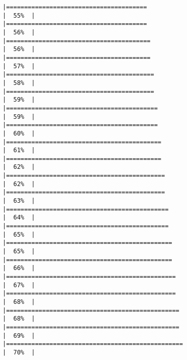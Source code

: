\documentclass[
]{article}
\begin{document}
\begin{verbatim}
|=======================================                               |  55%  |                                                                              |=======================================                               |  56%  |                                                                              |========================================                              |  56%  |                                                                              |========================================                              |  57%  |                                                                              |=========================================                             |  58%  |                                                                              |=========================================                             |  59%  |                                                                              |==========================================                            |  59%  |                                                                              |==========================================                            |  60%  |                                                                              |===========================================                           |  61%  |                                                                              |===========================================                           |  62%  |                                                                              |============================================                          |  62%  |                                                                              |============================================                          |  63%  |                                                                              |=============================================                         |  64%  |                                                                              |=============================================                         |  65%  |                                                                              |==============================================                        |  65%  |                                                                              |==============================================                        |  66%  |                                                                              |===============================================                       |  67%  |                                                                              |===============================================                       |  68%  |                                                                              |================================================                      |  68%  |                                                                              |================================================                      |  69%  |                                                                              |=================================================                     |  70%  |                                                                              
\end{verbatim}
\end{document}
